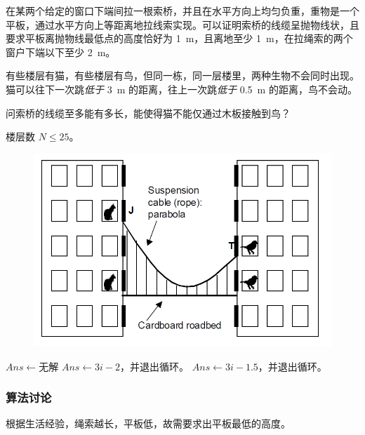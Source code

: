 				在某两个给定的窗口下端间拉一根索桥，并且在水平方向上均匀负重，重物是一个平板，通过水平方向上等距离地拉线索实现。可以证明索桥的线缆呈抛物线状，且要求平板离抛物线最低点的高度恰好为 \SI{1}{\meter}，且离地至少 \SI{1}{\meter}，在拉绳索的两个窗户下端以下至少  \SI{2}{\meter}。
				
				有些楼层有猫，有些楼层有鸟，但同一栋，同一层楼里，两种生物不会同时出现。猫可以往下一次跳\emph{低于} \SI{3}{\meter} 的距离，往上一次跳\emph{低于} \SI{0.5}{\meter} 的距离，鸟不会动。
				
				问索桥的线缆至多能有多长，能使得猫不能仅通过木板接触到鸟？
				
				楼层数 $N \le 25$。
				
				
				\begin{figure}[htb]
					\centering
					\includegraphics[width=0.7 \textwidth]{2004i.png}
					\caption{} \label{2004i}
				\end{figure}

				\begin{algorithm}[b]
				\caption{}
				\label{2004i}
					\begin{algorithmic}[1]
						\State $Ans  \gets \text{无解}$
								\State $Ans \gets 3i-2$，并退出循环。 
							\EndIf
								\State $Ans \gets 3i-1.5$，并退出循环。 
							\EndIf
						\EndFor
					\end{algorithmic}
				\end{algorithm}	
				
			\subsubsection{算法讨论}
				根据生活经验，绳索越长，平板低，故需要求出平板最低的高度。
				
